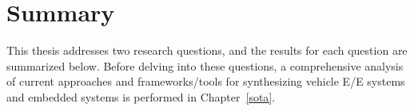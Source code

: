 







    \section{Summary}

    
    This thesis addresses two research questions, and the results for each question are summarized below. Before delving into these questions, a comprehensive analysis of current approaches and frameworks/tools for synthesizing vehicle E/E systems and embedded systems is performed in Chapter~\ref{sota}.
    
    
    
